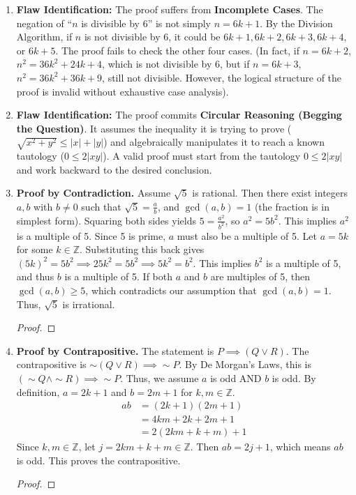 \documentclass[11pt]{article}
\renewcommand{\qedsymbol}{$\blacksquare$}
\begin{document}
\begin{enumerate}
    \item \textbf{Flaw Identification:} The proof suffers from \textbf{Incomplete Cases}. The negation of ``$n$ is divisible by 6'' is not simply $n = 6k+1$. By the Division Algorithm, if $n$ is not divisible by 6, it could be $6k+1, 6k+2, 6k+3, 6k+4,$ or $6k+5$. The proof fails to check the other four cases. (In fact, if $n = 6k+2$, $n^2 = 36k^2 + 24k + 4$, which is not divisible by 6, but if $n=6k+3$, $n^2 = 36k^2 + 36k + 9$, still not divisible. However, the logical structure of the proof is invalid without exhaustive case analysis).

    \item \textbf{Flaw Identification:} The proof commits \textbf{Circular Reasoning (Begging the Question)}. It assumes the inequality it is trying to prove ($\sqrt{x^2 + y^2} \le |x| + |y|$) and algebraically manipulates it to reach a known tautology ($0 \le 2|xy|$). A valid proof must start from the tautology $0 \le 2|xy|$ and work backward to the desired conclusion.

    \item \textbf{Proof by Contradiction.} Assume $\sqrt{5}$ is rational. Then there exist integers $a, b$ with $b \neq 0$ such that $\sqrt{5} = \frac{a}{b}$, and $\gcd(a,b) = 1$ (the fraction is in simplest form). Squaring both sides yields $5 = \frac{a^2}{b^2}$, so $a^2 = 5b^2$. This implies $a^2$ is a multiple of 5. Since 5 is prime, $a$ must also be a multiple of 5. Let $a = 5k$ for some $k \in \mathbb{Z}$. Substituting this back gives $(5k)^2 = 5b^2 \implies 25k^2 = 5b^2 \implies 5k^2 = b^2$. This implies $b^2$ is a multiple of 5, and thus $b$ is a multiple of 5. If both $a$ and $b$ are multiples of 5, then $\gcd(a,b) \ge 5$, which contradicts our assumption that $\gcd(a,b) = 1$. Thus, $\sqrt{5}$ is irrational.
    \begin{proof}\renewcommand{\qedsymbol}{$\blacksquare$}\end{proof}

    \item \textbf{Proof by Contrapositive.} The statement is $P \implies (Q \lor R)$. The contrapositive is $\sim(Q \lor R) \implies \sim P$. By De Morgan's Laws, this is $(\sim Q \land \sim R) \implies \sim P$. Thus, we assume $a$ is odd AND $b$ is odd. By definition, $a = 2k+1$ and $b = 2m+1$ for $k, m \in \mathbb{Z}$.
    \begin{align*}
        ab &= (2k+1)(2m+1) \\
           &= 4km + 2k + 2m + 1 \\
           &= 2(2km + k + m) + 1
    \end{align*}
    Since $k, m \in \mathbb{Z}$, let $j = 2km + k + m \in \mathbb{Z}$. Then $ab = 2j + 1$, which means $ab$ is odd. This proves the contrapositive.
    \begin{proof}\renewcommand{\qedsymbol}{$\blacksquare$}\end{proof}


\end{enumerate}
\end{document}
